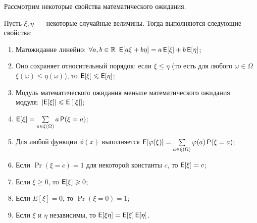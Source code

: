 Рассмотрим некоторые свойства математического ожидания.
\begin{theorem}
    Пусть \(\xi, \eta\)~--- некоторые случайные величины. Тогда выполняются следующие свойства:
    \begin{enumerate}
        \item Матожидание линейно: \(\forall a, b \in \mathbb{R}\ \operatorname{\mathsf{E}}[a\xi + b\eta] = a\operatorname{\mathsf{E}}[\xi] + b\operatorname{\mathsf{E}}[\eta]\);
        \item Оно сохраняет относительный порядок: если \(\xi \leq \eta\) (то есть для любого \(\omega \in \Omega\) \(\xi(\omega) \leq \eta(\omega)\)), то \(\operatorname{\mathsf{E}}[\xi] \leqslant \operatorname{\mathsf{E}}[\eta]\);
        \item Модуль математического ожидания меньше математического ожидания модуля: \(\left|\operatorname{\mathsf{E}}[\xi]\right| \leqslant \operatorname{\mathsf{E}}\left[|\xi\right|]\);
        \item \(\operatorname{\mathsf{E}}[\xi] = \sum\limits_{a \in \xi(\Omega)} a\operatorname{\mathsf{P}}(\xi = a)\);
        \item Для любой функции \(\phi(x)\) выполняется \(\operatorname{\mathsf{E}}[\varphi(\xi)] = \sum\limits_{a \in \xi(\Omega)} \varphi(a)\operatorname{\mathsf{P}}(\xi = a)\);
        \item Если \(\Pr(\xi = c) = 1\) для некоторой константы \(c\), то \(\operatorname{\mathsf{E}}[\xi] = c\);
        \item Если \(\xi \geq 0\), то \(\operatorname{\mathsf{E}}[\xi] \geqslant 0\); 
        \item Если \(E[\xi] = 0\), то \(\Pr(\xi = 0) = 1\);
        \item Если \(\xi\) и \(\eta\) независимы, то \(\operatorname{\mathsf{E}}[\xi\eta] = \operatorname{\mathsf{E}}[\xi]\operatorname{\mathsf{E}}[\eta]\).
    \end{enumerate}
\end{theorem}
